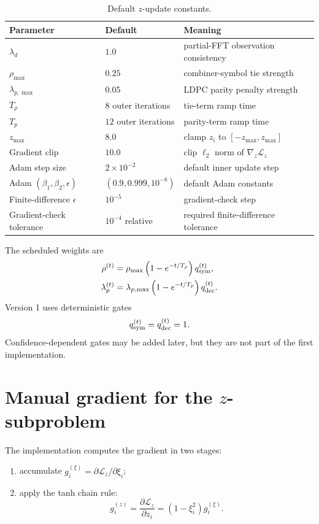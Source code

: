 \documentclass[11pt]{article}
\begin{document}
\begin{table}[h]
\centering
\caption{Default $z$-update constants.}
\begin{tabular}{@{}lll@{}}
\toprule
Parameter & Default & Meaning \\
\midrule
$\lambda_d$ & $1.0$ & partial-FFT observation consistency \\
$\rho_{\max}$ & $0.25$ & combiner-symbol tie strength \\
$\lambda_{p,\max}$ & $0.05$ & LDPC parity penalty strength \\
$T_\rho$ & $8$ outer iterations & tie-term ramp time \\
$T_p$ & $12$ outer iterations & parity-term ramp time \\
$z_{\max}$ & $8.0$ & clamp $z_i$ to $[-z_{\max},z_{\max}]$ \\
Gradient clip & $10.0$ & clip $\ell_2$ norm of $\nabla_z\mathcal L_z$ \\
Adam step size & $2\times 10^{-2}$ & default inner update step \\
Adam $(\beta_1,\beta_2,\epsilon)$ & $(0.9,0.999,10^{-8})$ & default Adam constants \\
Finite-difference $\epsilon$ & $10^{-5}$ & gradient-check step \\
Gradient-check tolerance & $10^{-4}$ relative & required finite-difference tolerance \\
\bottomrule
\end{tabular}
\end{table}

The scheduled weights are
\begin{align}
\rho^{(t)}&=\rho_{\max}\left(1-e^{-t/T_\rho}\right)q_{\rm sym}^{(t)},\\
\lambda_p^{(t)}&=\lambda_{p,\max}\left(1-e^{-t/T_p}\right)q_{\rm dec}^{(t)}.
\end{align}
Version 1 uses deterministic gates
\begin{equation}
q_{\rm sym}^{(t)}=q_{\rm dec}^{(t)}=1.
\end{equation}
Confidence-dependent gates may be added later, but they are not part of the first implementation.

\section{Manual gradient for the $z$-subproblem}
\label{sec:z-gradient}

The implementation computes the gradient in two stages:
\begin{enumerate}[label=(\alph*)]
\item accumulate $g_i^{(\xi)}=\partial\mathcal L_z/\partial\xi_i$;
\item apply the tanh chain rule:
\begin{equation}
 g_i^{(z)}=\frac{\partial\mathcal L_z}{\partial z_i}
 =\left(1-\xi_i^2\right)g_i^{(\xi)}.
\end{equation}
\end{enumerate}
\end{document}
